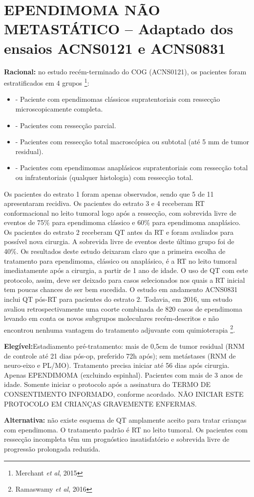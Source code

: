 \documentclass[11pt,a4paper,oldfontcommands]{memoir}
\begin{document}
\section{EPENDIMOMA NÃO METASTÁTICO -- Adaptado dos ensaios ACNS0121 e ACNS0831}
{\let\thefootnote\relax{}}
\small{
\textbf{Racional:} no estudo recém-terminado do COG (ACNS0121), os pacientes foram estratificados em 4 grupos \footnote{Merchant \textit{et al}, 2015}:
\begin{itemize}
\item[Estrato 1] - Paciente com ependimomas clássicos supratentoriais com ressecção microscopicamente completa.
\item[Estrato 2] - Pacientes com ressecção parcial.
\item[Estrato 3] - Pacientes com ressecção total macroscópica ou subtotal (até 5 mm de tumor residual).
\item[Estrato 4] - Pacientes com ependimomas anaplásicos supratentoriais com ressecção total ou infratentoriais (qualquer histologia) com ressecção total.
\end{itemize}

Os pacientes do estrato 1 foram apenas observados, sendo que 5 de 11 apresentaram recidiva. Os pacientes do estrato 3 e 4 receberam RT conformacional no leito tumoral logo após a ressecção, com sobrevida livre de eventos de 75\% para ependimoma clássico e 60\% para ependimoma anaplásico. Os pacientes do estrato 2 receberam QT antes da RT e foram avaliados para possível nova cirurgia. A sobrevida livre de eventos deste último grupo foi de 40\%. Os resultados deste estudo deixaram claro que a primeira escolha de tratamento para ependimoma, clássico ou anaplásico, é a RT no leito tumoral imediatamente após a cirurgia, a partir de 1 ano de idade. O uso de QT com este protocolo, assim, deve ser deixado para casos selecionados nos quais a RT inicial tem poucas chances de ser bem sucedida. O estudo em andamento ACNS0831 inclui QT pós-RT para pacientes do estrato 2. Todavia, em 2016, um estudo avaliou retrospectivamente uma coorte combinada de 820 casos de ependimoma levando em conta os novos subgrupos moleculares recém-descritos e não encontrou nenhuma vantagem do tratamento adjuvante com quimioterapia \footnote{Ramaswamy \textit{et al}, 2016}.

\textbf{Elegível:}Estadiamento pré-tratamento: mais de 0,5cm de tumor residual (RNM de controle até 21 dias pós-op, preferido 72h após); sem metástases (RNM de neuro-eixo e PL/MO). Tratamento precisa iniciar até 56 dias após cirurgia. Apenas EPENDIMOMA (excluindo espinhal). Pacientes com mais de 3 anos de idade. Somente iniciar o protocolo após a assinatura do TERMO DE CONSENTIMENTO INFORMADO, conforme acordado. NÃO INICIAR ESTE PROTOCOLO EM CRIANÇAS GRAVEMENTE ENFERMAS.

\textbf{Alternativa:} não existe esquema de QT amplamente aceito para tratar crianças com ependimoma. O tratamento padrão é RT no leito tumoral. Os pacientes com ressecção incompleta têm um prognóstico insatisfatório e sobrevida livre de progressão prolongada reduzida.}
\end{document}
